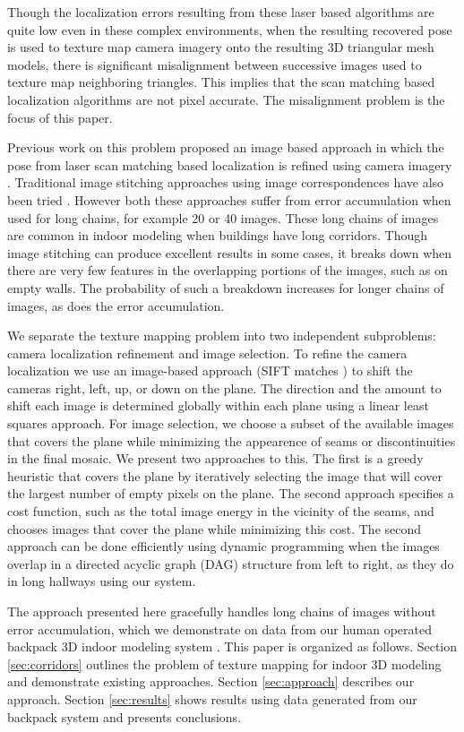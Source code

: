 \documentclass[runningheads]{llncs}
\begin{document}
Though the localization errors resulting from these laser based 
algorithms are quite low even in these complex environments,
when the resulting recovered pose is used to texture
map camera imagery onto the resulting 3D triangular mesh
models, there is significant misalignment between successive
images used to texture map neighboring triangles. This implies
that the scan matching based localization algorithms are not
pixel accurate. The misalignment problem is the focus of this paper. 

Previous work on this problem proposed an
image based approach in which the pose from laser scan matching
based localization is refined using camera imagery \cite{liu2010indoor}. Traditional image stitching approaches using image correspondences have also been tried \cite{brown2007automatic}. However both these approaches suffer from error accumulation when used for long chains, for example 20 or 40 images. These long chains of images are common in indoor modeling when buildings have long corridors. Though image stitching can produce excellent results in some cases, it breaks down when there are very few features in the overlapping portions of the images, such as on empty walls. The probability of such a breakdown increases for longer chains of images, as does the error accumulation. 

We separate the texture mapping problem into two independent subproblems: camera localization refinement and image selection. To refine the camera localization we use an image-based approach (SIFT matches \cite{lowe1999object}) to shift the cameras right, left, up, or down on the plane. The direction and the amount to shift each image is determined globally within each plane using a linear least squares approach. For image selection, we choose a subset of the available images that covers the plane while minimizing the appearence of seams or discontinuities in the final mosaic. We present two approaches to this. The first is a greedy heuristic that covers the plane by iteratively selecting the image that will cover the largest number of empty pixels on the plane. The second approach specifies a cost function, such as the total image energy in the vicinity of the seams, and chooses images that cover the plane while minimizing this cost. The second approach can be done efficiently using dynamic programming when the images overlap in a directed acyclic graph (DAG) structure from left to right, as they do in long hallways using our system. 

The approach presented here gracefully handles long chains of images without error accumulation, which we demonstrate on data from our human operated backpack 3D indoor modeling system \cite{chen2010indoor}. This paper is organized as follows. Section \ref{sec:corridors} outlines the problem of texture mapping for indoor 3D modeling and demonstrate existing approaches. Section \ref{sec:approach} describes our approach. Section \ref{sec:results} shows results using data generated from our backpack system and presents conclusions. 
\end{document}
